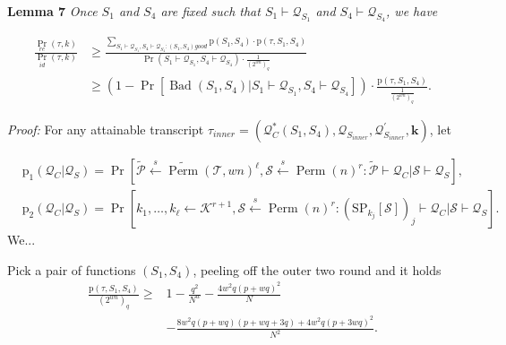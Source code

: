 \noindent \textbf{Lemma 7} \emph{Once $S_{1}$ and $S_{4}$ are fixed such that $S_{1} \vdash \mathcal{Q}_{S_{1}}$ and $S_{4} \vdash \mathcal{Q}_{S_{4}}$, we have}

\begin{equation}
\begin{aligned}
\frac{\operatorname{Pr}_{r e}(\tau, k)}{\operatorname{Pr}_{i d}(\tau, k)} &\geq \frac{\sum_{S_{1} \vdash \mathcal{Q}_{S_{1}}, S_{4} \vdash \mathcal{Q}_{S_{4}}: \left(S_{1}, S_{4}\right)good } \mathrm{p}\left(S_{1}, S_{4}\right) \cdot \mathrm{p}\left(\tau, S_{1}, S_{4}\right)}{\operatorname{Pr}(S_{1} \vdash \mathcal{Q}_{S_{1}}, S_{4} \vdash \mathcal{Q}_{S_{4}}) \cdot \frac{1}{\left(2^{w n}\right)_{q}}}\\
&\geq \left(1-\operatorname{Pr}\left[\operatorname{Bad}\left(S_{1},S_{4}\right) | S_{1} \vdash \mathcal{Q}_{S_{1}}, S_{4} \vdash \mathcal{Q}_{S_{4}}\right]\right) \cdot
\frac{\mathrm{p}\left(\tau, S_{1}, S_{4}\right)}{\frac{1}{\left(2^{w n}\right)_{q}}}.
\end{aligned}
\end{equation}

\noindent \emph{Proof:} For any attainable transcript $\tau_{inner}=\left(\mathcal{Q}_{C}^{*}\left(S_{1},S_{4}\right), \mathcal{Q}_{S_{inner}}, \mathcal{Q}_{S_{inner}}^{\prime}, \mathbf{k}\right)$, let

$$
\begin{aligned}
&\mathrm{p}_{1}\left(\mathcal{Q}_{C} | \mathcal{Q}_{S}\right)=\operatorname{Pr}\left[\widetilde{\mathcal{P}} \stackrel{s}{\leftarrow} \widetilde{\operatorname{Perm}}(\mathcal{T}, w n)^{\ell}, \mathcal{S} \stackrel{s}{\leftarrow} \operatorname{Perm}(n)^{r}: \tilde{\mathcal{P}} \vdash \mathcal{Q}_{C} | \mathcal{S} \vdash \mathcal{Q}_{S}\right],\\
&\mathrm{p}_{2}\left(\mathcal{Q}_{C} | \mathcal{Q}_{S}\right)=\operatorname{Pr}\left[k_{1}, \ldots, k_{\ell} \leftarrow \mathcal{K}^{r+1}, \mathcal{S} \stackrel{s}{\leftarrow} \operatorname{Perm}(n)^{r}:\left(\mathrm{SP}_{k_{j}}[\mathcal{S}]\right)_{j} \vdash \mathcal{Q}_{C} | \mathcal{S} \vdash \mathcal{Q}_{S}\right].
\end{aligned}
$$
We...    






\begin{lemma}
	\label{lemma:innter-ratio-4-rounds}
	
	Pick a pair of functions $(S_{1}, S_{4})$, peeling off the outer two round and it holds
	\begin{align}
	\frac{\mathrm{p}\left(\tau, S_{1}, S_{4}\right)}{\left(2^{w n}\right)_{q}} \geq &1-\frac{q^2}{N^w}- \frac{4 w^2 q(p+wq)^2}{N}\\
	&- \frac{8 w^2 q(p+w q)(p+w q +3 q)+4 w^2 q(p+3 wq)^2}{N^2}.
	\label{eq:bound-innter-ratio-4-rounds}
	\end{align}
\end{lemma}



